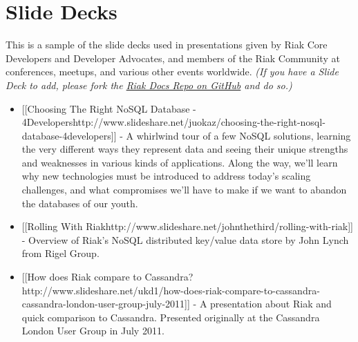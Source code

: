 \documentclass[letter]{book}
\newcounter{tab}[chapter]
\begin{document}
\section{Slide Decks}\label{slide-decks}

This is a sample of the slide decks used in presentations given by Riak Core Developers and Developer Advocates, and members of the Riak Community at conferences, meetups, and various other events worldwide. \emph{(If you have a Slide Deck to add, please fork the \href{https://github.com/basho/basho_docs}{Riak Docs Repo on GitHub} and do so.)}

\begin{itemize}
\itemsep1pt\parskip0pt
\item
  {[}{[}Choosing The Right NoSQL Database - 4Developers\textbar{}http://www.slideshare.net/juokaz/choosing-the-right-nosql-database-4developers{]}{]} - A whirlwind tour of a few NoSQL solutions, learning the very different ways they represent data and seeing their unique strengths and weaknesses in various kinds of applications. Along the way, we'll learn why new technologies must be introduced to address today's scaling challenges, and what compromises we'll have to make if we want to abandon the databases of our youth.
\item
  {[}{[}Rolling With Riak\textbar{}http://www.slideshare.net/johnthethird/rolling-with-riak{]}{]} - Overview of Riak's NoSQL distributed key/value data store by John Lynch from Rigel Group.
\item
  {[}{[}How does Riak compare to Cassandra?\textbar{}http://www.slideshare.net/ukd1/how-does-riak-compare-to-cassandra-cassandra-london-user-group-july-2011{]}{]} - A presentation about Riak and quick comparison to Cassandra. Presented originally at the Cassandra London User Group in July 2011.
\end{itemize}
\end{document}
